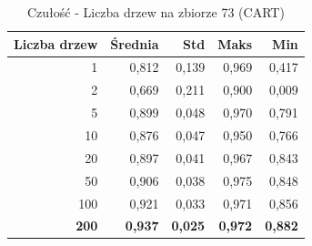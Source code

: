 \begin{table}[htbp]
\centering
\small
\setlength{\tabcolsep}{6pt}
\renewcommand{\arraystretch}{1.2}
\caption{Czułość - Liczba drzew na zbiorze 73 (CART)}
\label{tab:CART_tree_count_73_recall}
\begin{tabular}{r|r|r|r|r}
\toprule
Liczba drzew & Średnia & Std & Maks & Min \\
\hline
1 & 0,812 & 0,139 & 0,969 & 0,417 \\
2 & 0,669 & 0,211 & 0,900 & 0,009 \\
5 & 0,899 & 0,048 & 0,970 & 0,791 \\
10 & 0,876 & 0,047 & 0,950 & 0,766 \\
20 & 0,897 & 0,041 & 0,967 & 0,843 \\
50 & 0,906 & 0,038 & 0,975 & 0,848 \\
100 & 0,921 & 0,033 & 0,971 & 0,856 \\
\textbf{200} & \textbf{0,937} & \textbf{0,025} & \textbf{0,972} & \textbf{0,882} \\
\bottomrule
\end{tabular}
\end{table}